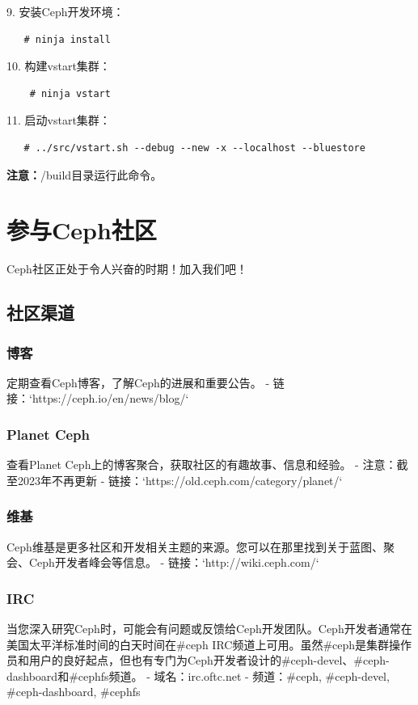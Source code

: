 \documentclass[12pt,UTF8]{ctexbook}
\begin{document}
9. 安装Ceph开发环境：
   \begin{verbatim}
   # ninja install
   \end{verbatim}

10. 构建vstart集群：
    \begin{verbatim}
    # ninja vstart
    \end{verbatim}

11. 启动vstart集群：
   \begin{verbatim}
   # ../src/vstart.sh --debug --new -x --localhost --bluestore
   \end{verbatim}
   
   \textbf{注意：}/build目录运行此命令。

\chapter{参与Ceph社区}
Ceph社区正处于令人兴奋的时期！加入我们吧！

\section{社区渠道}

\subsection{博客}
定期查看Ceph博客，了解Ceph的进展和重要公告。
- 链接：`https://ceph.io/en/news/blog/`

\subsection{Planet Ceph}
查看Planet Ceph上的博客聚合，获取社区的有趣故事、信息和经验。
- 注意：截至2023年不再更新
- 链接：`https://old.ceph.com/category/planet/`

\subsection{维基}
Ceph维基是更多社区和开发相关主题的来源。您可以在那里找到关于蓝图、聚会、Ceph开发者峰会等信息。
- 链接：`http://wiki.ceph.com/`

\subsection{IRC}
当您深入研究Ceph时，可能会有问题或反馈给Ceph开发团队。Ceph开发者通常在美国太平洋标准时间的白天时间在#ceph IRC频道上可用。虽然#ceph是集群操作员和用户的良好起点，但也有专门为Ceph开发者设计的#ceph-devel、#ceph-dashboard和#cephfs频道。
- 域名：irc.oftc.net
- 频道：#ceph, #ceph-devel, #ceph-dashboard, #cephfs
\end{document}
